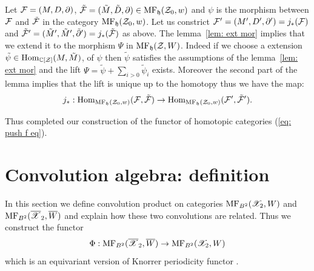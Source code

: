  Let $\mathcal{F}=(M,D,\partial)$, $\tilde{\mathcal{F}}=(\tilde{M},\tilde{D},\partial)\in \mathrm{MF}_{\mathfrak{h}} (\mathcal{Z}_0,w)$ and $\psi$ is the morphism between $\mathcal{F}$ and $\tilde{\mathcal{F}}$ in the category $\mathrm{MF}_{\mathfrak{h}}(\mathcal{Z}_0,w)$.
 Let us constrict $\mathcal{F}'=(M',D',\partial')=j_*(\mathcal{F})$ and $\tilde{\mathcal{F}}'=(\tilde{M}',\tilde{M}',\tilde{\partial}')=  j_*(\tilde{\mathcal{F}})$ as above.
 The lemma~\ref{lem: ext mor} implies that we extend it to the morphism $\Psi$ in $\mathrm{MF}_{\mathfrak{h}}(\mathcal{Z},W)$. Indeed if we choose a extension $\tilde{\psi}\in \mathop{{\rm Hom}}\nolimits_{\mathbb{C}[\mathcal{Z}]}(M,\tilde{M})$,
  of $\psi$ then $\tilde{\psi}$ satisfies the assumptions of the lemma~\ref{lem: ext mor} and the lift $\Psi=\tilde{\psi}+\sum_{i>0}\tilde{\psi}_i$ exists. Moreover the second part of the lemma implies that
  the lift is unique up to the  homotopy thus we have the map:
  $$  j_*:  \mathop{{\rm Hom}}\nolimits_{\mathrm{MF}_{\mathfrak{h}}(\mathcal{Z}_0,w)}(\mathcal{F},\tilde{\mathcal{F}})\to    \mathop{{\rm Hom}}\nolimits_{\mathrm{MF}_{\mathfrak{h}}(\mathcal{Z}_0,w)}(\mathcal{F}',\tilde{\mathcal{F}}').$$

  Thus completed our construction of the functor of homotopic categories (\ref{eq: push f eq}).















\section{Convolution algebra: definition}\label{sec:convolution}
In this section we define convolution product on  categories $\mathrm{MF}_{B^2}(\mathscr{X}_2,W)$ and $\mathrm{MF}_{B^2}(\overline{\mathscr{X}}_2,\overline{W})$ and explain how
these two convolutions are related. Thus we construct the functor $$\Phi: \mathrm{MF}_{B^2}(\overline{\mathscr{X}}_2,\overline{W})\to \mathrm{MF}_{B^2}(\mathscr{X}_2,W)$$ which is an equivariant
version of Knorrer periodicity functor \cite{Kn}.

